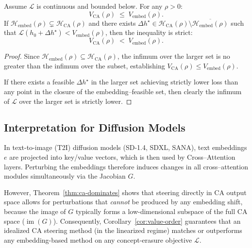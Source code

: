 \begin{corollary}
\label{cor:value-order}
Assume $\mathcal{L}$ is continuous and bounded below.
For any $\rho > 0$:
\begin{equation}
    V_{\mathrm{CA}}(\rho)
    \;\le\;
    V_{\mathrm{embed}}(\rho).
\end{equation}
If $\mathcal{H}_{\mathrm{embed}}(\rho) \subsetneq \mathcal{H}_{\mathrm{CA}}(\rho)$
and there exists 
$\Delta h^\star \in \mathcal{H}_{\mathrm{CA}}(\rho)
 \setminus \overline{\mathcal{H}_{\mathrm{embed}}(\rho)}$
such that
$\mathcal{L}(h_0 + \Delta h^\star) < V_{\mathrm{embed}}(\rho)$,
then the inequality is strict:
\begin{equation}
    V_{\mathrm{CA}}(\rho)
    \;<\;
    V_{\mathrm{embed}}(\rho).
\end{equation}
\end{corollary}

\begin{proof}
Since 
$\mathcal{H}_{\mathrm{embed}}(\rho)
 \subseteq
 \mathcal{H}_{\mathrm{CA}}(\rho)$,
the infimum over the larger set is no greater than the infimum over the
subset, establishing 
$V_{\mathrm{CA}}(\rho) \le V_{\mathrm{embed}}(\rho)$.

If there exists a feasible $\Delta h^\star$ in the larger set achieving
strictly lower loss than any point in the closure of the embedding–feasible
set, then clearly the infimum of $\mathcal{L}$ over the larger set is
strictly lower. 
\end{proof}

\subsection{Interpretation for Diffusion Models}

In text-to-image (T2I) diffusion models (SD-1.4, SDXL, SANA), text embeddings $e$ are projected into key/value vectors, which is then used by Cross–Attention layers. Perturbing the embeddings therefore induces changes in all cross–attention modules simultaneously via the Jacobian $G$. 

However, Theorem~\ref{thm:ca-dominates} shows that steering directly in CA output space allows for perturbations that \emph{cannot} be produced by any embedding shift, because the image of $G$ typically forms a low-dimensional subspace of the full CA space ($\operatorname{im}(G)$). Consequently, Corollary~\ref{cor:value-order} guarantees that an idealized CA steering method (in the linearized regime) matches or outperforms any embedding-based method on any concept-erasure objective $\mathcal{L}$.


